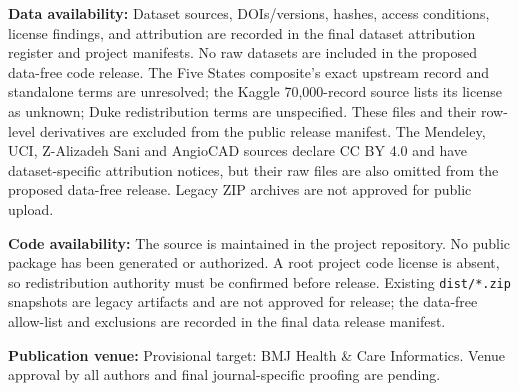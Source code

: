 \documentclass[12pt]{article}
\begin{document}
\textbf{Data availability:} Dataset sources, DOIs/versions, hashes, access
conditions, license findings, and attribution are recorded in the final
dataset attribution register and project manifests. No raw datasets are
included in the proposed data-free code release. The Five States composite's exact upstream record and standalone
terms are unresolved; the Kaggle 70,000-record source lists its license as
unknown; Duke redistribution terms are unspecified. These files and their
row-level derivatives are excluded from the public release manifest. The
Mendeley, UCI, Z-Alizadeh Sani and AngioCAD sources declare CC BY 4.0 and have
dataset-specific attribution notices, but their raw files are also omitted
from the proposed data-free release. Legacy ZIP archives are not approved for
public upload.

\textbf{Code availability:} The source is maintained in the project
repository. No public package has been generated or authorized. A root project
code license is absent, so redistribution authority must be confirmed before
release. Existing \texttt{dist/*.zip} snapshots are legacy artifacts and are
not approved for release; the data-free allow-list and exclusions are recorded
in the final data release manifest.

\textbf{Publication venue:} Provisional target: BMJ Health \& Care Informatics. Venue approval by all authors and final journal-specific proofing are pending.



\end{document}
